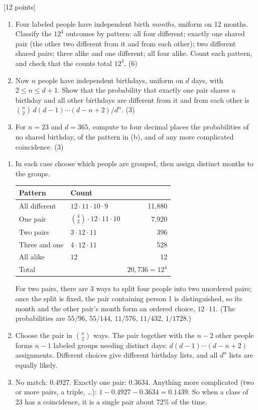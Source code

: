 \documentclass[11pt,letterpaper]{article}
\newcommand{\pts}[1]{\hfill\textcolor{muted}{\small[#1 points]}}
\newcommand{\partpts}[1]{\unskip\nobreak\hspace{.3em}\mbox{\textcolor{muted}{\small(#1)}}}
\newcounter{problem}
\newcommand{\problem}[2]{\par\addvspace{11pt}\Needspace{7\baselineskip}\stepcounter{problem}{\bfseries\color{indigo}\theproblem.\ #1}\pts{#2}\par\nobreak}
\begin{document}
\problem{What kind of collision?}{12}
\begin{enumerate}
 \item Four labeled people have independent birth \emph{months}, uniform on
 12 months. Classify the $12^4$ outcomes by pattern: all four different;
 exactly one shared pair (the other two different from it and from each
 other); two different shared pairs; three alike and one different; all
 four alike. Count each pattern, and check that the counts total $12^4$.
 \partpts{6}
 \item Now $n$ people have independent birthdays, uniform on $d$ days,
 with $2\le n\le d+1$. Show that the probability that exactly one pair
 shares a birthday and all other birthdays are different from it and from
 each other is $\binom n2\,d(d-1)\cdots(d-n+2)/d^n$. \partpts{3}
 \item For $n=23$ and $d=365$, compute to four decimal places the
 probabilities of no shared birthday, of the pattern in (b), and of any
 more complicated coincidence. \partpts{3}
\end{enumerate}
\begin{solution}
\begin{enumerate}
 \item In each case choose which people are grouped, then assign distinct
 months to the groups.
 \begin{center}\small
 \begin{tabular}{@{}llr@{}}
 \toprule
 Pattern & Count & \\
 \midrule
 All different & $12\cdot11\cdot10\cdot9$ & 11{,}880\\
 One pair & $\binom42\cdot12\cdot11\cdot10$ & 7{,}920\\
 Two pairs & $3\cdot12\cdot11$ & 396\\
 Three and one & $4\cdot12\cdot11$ & 528\\
 All alike & $12$ & 12\\
 \midrule
 Total & & $20{,}736=12^4$\\
 \bottomrule
 \end{tabular}
 \end{center}
 For two pairs, there are $3$ ways to split four people into two unordered
 pairs; once the split is fixed, the pair containing person 1 is
 distinguished, so its month and the other pair's month form an ordered
 choice, $12\cdot11$. (The probabilities are $55/96$, $55/144$, $11/576$,
 $11/432$, $1/1728$.)
 \item Choose the pair in $\binom n2$ ways. The pair together with the
 $n-2$ other people forms $n-1$ labeled groups needing distinct days:
 $d(d-1)\cdots(d-n+2)$ assignments. Different choices give different
 birthday lists, and all $d^n$ lists are equally likely.
 \item No match: $0.4927$. Exactly one pair: $0.3634$. Anything more
 complicated (two or more pairs, a triple, \dots):
 $1-0.4927-0.3634=0.1439$. So when a class of 23 has a coincidence, it is a
 single pair about 72\% of the time.
\end{enumerate}
\end{solution}
\end{document}
